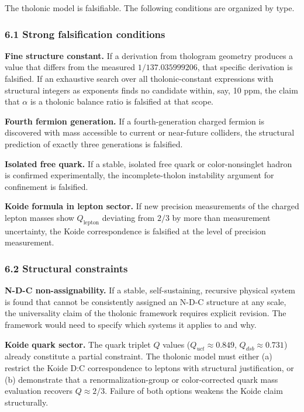 \documentclass[
  11pt,
  letterpaper,
]{article}
\begin{document}
The tholonic model is falsifiable. The following conditions are
organized by type.

\subsubsection{6.1 Strong falsification
conditions}\label{strong-falsification-conditions}

\textbf{Fine structure constant.} If a derivation from thologram
geometry produces a value that differs from the measured
\(1/137.035999206\), that specific derivation is falsified. If an
exhaustive search over all tholonic-constant expressions with structural
integers as exponents finds no candidate within, say, 10 ppm, the claim
that \(\alpha\) is a tholonic balance ratio is falsified at that scope.

\textbf{Fourth fermion generation.} If a fourth-generation charged
fermion is discovered with mass accessible to current or near-future
colliders, the structural prediction of exactly three generations is
falsified.

\textbf{Isolated free quark.} If a stable, isolated free quark or
color-nonsinglet hadron is confirmed experimentally, the
incomplete-tholon instability argument for confinement is falsified.

\textbf{Koide formula in lepton sector.} If new precision measurements
of the charged lepton masses show \(Q_{\text{lepton}}\) deviating from
\(2/3\) by more than measurement uncertainty, the Koide correspondence
is falsified at the level of precision measurement.

\subsubsection{6.2 Structural constraints}\label{structural-constraints}

\textbf{N-D-C non-assignability.} If a stable, self-sustaining,
recursive physical system is found that cannot be consistently assigned
an N-D-C structure at any scale, the universality claim of the tholonic
framework requires explicit revision. The framework would need to
specify which systems it applies to and why.

\textbf{Koide quark sector.} The quark triplet \(Q\) values
(\(Q_{uct} \approx 0.849\), \(Q_{dsb} \approx 0.731\)) already
constitute a partial constraint. The tholonic model must either (a)
restrict the Koide D:C correspondence to leptons with structural
justification, or (b) demonstrate that a renormalization-group or
color-corrected quark mass evaluation recovers \(Q \approx 2/3\).
Failure of both options weakens the Koide claim structurally.
\end{document}
